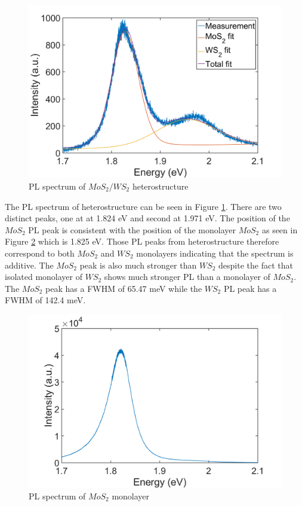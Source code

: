 \begin{figure}[h]
	\begin{center}
		\includegraphics[scale=0.3]{Heterostructures/HeterostructurePLSpectrumFitted.png}
		\caption{PL spectrum of $MoS_2/WS_2$ heterostructure}
		\label{fig:HeterostructuresPLSpectrumFitted}
	\end{center}
\end{figure}

The PL spectrum of heterostructure can be seen in Figure \ref{fig:HeterostructuresPLSpectrumFitted}. There are two distinct peaks, one at at 1.824 eV and second at 1.971 eV. The position of the $MoS_2$ PL peak is consistent with the position of the monolayer $MoS_2$ as seen in Figure \ref{fig:HeterostructuresPLSpectrumMono} which is 1.825 eV. Those PL peaks from heterostructure therefore correspond to both $MoS_2$ and $WS_2$ monolayers indicating that the spectrum is additive. The $MoS_2$ peak is also much stronger than $WS_2$ despite the fact that isolated monolayer of $WS_2$ shows much stronger PL than a monolayer of $MoS_2$. The $MoS_2$ peak has a FWHM of 65.47 meV while the $WS_2$ PL peak has a FWHM of 142.4 meV. 

\begin{figure}[h]
	\begin{center}
		\includegraphics[scale=0.3]{Heterostructures/HeterostructurePLSpectrumMono.png}
		\caption{PL spectrum of $MoS_2$ monolayer}
		\label{fig:HeterostructuresPLSpectrumMono}
	\end{center}
\end{figure}

